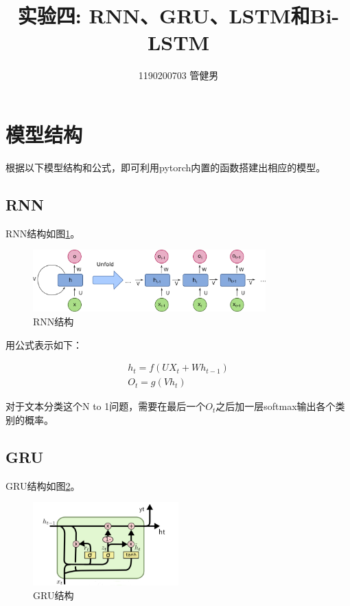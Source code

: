 \documentclass{article}
\title{实验四: RNN、GRU、LSTM和Bi-LSTM}
\author{1190200703 管健男}
\date{}
\begin{document}
\maketitle

\section{模型结构}

根据以下模型结构和公式，即可利用pytorch内置的函数搭建出相应的模型。

\subsection{RNN}

RNN结构如图\ref{RNN}。

\begin{figure}[H]
    \centering
    \includegraphics[width=0.8\textwidth]{figures/rnn.png}
    \caption{RNN结构}
    \label{RNN}
\end{figure}

用公式表示如下：

\begin{gather*}
    h_t = f(U X_t + W h_{t-1}) \\
    O_t = g(V h_t)
\end{gather*}

对于文本分类这个N to 1问题，需要在最后一个$O_t$之后加一层softmax输出各个类别的概率。

\subsection{GRU}

GRU结构如图\ref{GRU}。

\begin{figure}[H]
    \centering
    \includegraphics[width=0.5\textwidth]{figures/gru.png}
    \caption{GRU结构}
    \label{GRU}
\end{figure}
\end{document}
